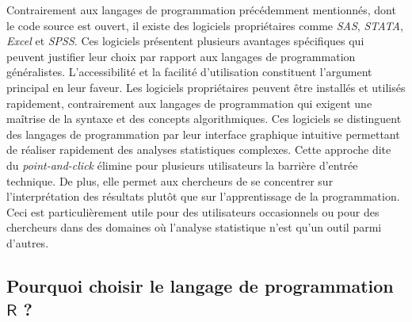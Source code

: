 \documentclass[
  letterpaper,
  DIV=11,
  numbers=noendperiod,
  oneside]{scrreprt}
\begin{document}
Contrairement aux langages de programmation précédemment mentionnés,
dont le code source est ouvert, il existe des logiciels propriétaires
comme \emph{SAS}, \emph{STATA}, \emph{Excel} et \emph{SPSS}. Ces
logiciels présentent plusieurs avantages spécifiques qui peuvent
justifier leur choix par rapport aux langages de programmation
généralistes. L'accessibilité et la facilité d'utilisation constituent
l'argument principal en leur faveur. Les logiciels propriétaires peuvent
être installés et utilisés rapidement, contrairement aux langages de
programmation qui exigent une maîtrise de la syntaxe et des concepts
algorithmiques. Ces logiciels se distinguent des langages de
programmation par leur interface graphique intuitive permettant de
réaliser rapidement des analyses statistiques complexes. Cette approche
dite du \emph{point-and-click} élimine pour plusieurs utilisateurs la
barrière d'entrée technique. De plus, elle permet aux chercheurs de se
concentrer sur l'interprétation des résultats plutôt que sur
l'apprentissage de la programmation. Ceci est particulièrement utile
pour des utilisateurs occasionnels ou pour des chercheurs dans des
domaines où l'analyse statistique n'est qu'un outil parmi d'autres.

\hypertarget{pourquoi-choisir-le-langage-de-programmation-textsfr}{%
\subsection{\texorpdfstring{Pourquoi choisir le langage de programmation
\(\textsf{R}\)
?}{Pourquoi choisir le langage de programmation \textbackslash textsf\{R\} ?}}\label{pourquoi-choisir-le-langage-de-programmation-textsfr}}
\end{document}
